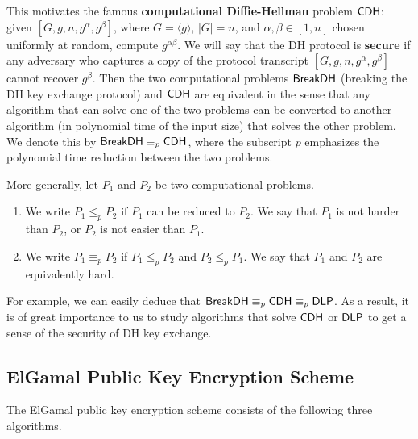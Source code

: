 This motivates the famous {\bf computational Diffie-Hellman} problem ${\sf CDH}$: given 
$[G, g, n, g^\alpha, g^\beta]$, where $G = \langle g \rangle$, $|G| = n$, 
and $\alpha, \beta \in [1, n]$ chosen uniformly at random, compute $g^{\alpha\beta}$. 
We will say that the DH protocol is {\bf secure} if any adversary who captures a 
copy of the protocol transcript $[G, g, n, g^\alpha, g^\beta]$ cannot recover 
$g^\beta$. Then the two computational problems ${\sf BreakDH}$ (breaking the DH 
key exchange protocol) and ${\sf CDH}$ are equivalent in the sense that any algorithm 
that can solve one of the two problems can be converted to another algorithm 
(in polynomial time of the input size) that solves the other problem. We denote this 
by ${\sf BreakDH} \equiv_p {\sf CDH}$, where the subscript $p$ emphasizes the polynomial 
time reduction between the two problems. 

More generally, let $P_1$ and $P_2$ be two computational problems. 
\begin{enumerate}[(1)]
    \item We write $P_1 \leq_p P_2$ if $P_1$ can be reduced to $P_2$. We say that 
          $P_1$ is not harder than $P_2$, or $P_2$ is not easier than $P_1$. 
    \item We write $P_1 \equiv_p P_2$ if $P_1 \leq_p P_2$ and $P_2 \leq_p P_1$. 
          We say that $P_1$ and $P_2$ are equivalently hard. 
\end{enumerate}

For example, we can easily deduce that ${\sf BreakDH} \equiv_p {\sf CDH} \equiv_p {\sf DLP}$. 
As a result, it is of great importance to us to study algorithms that solve 
${\sf CDH}$ or ${\sf DLP}$ to get a sense of the security of DH key exchange. 

\subsection{ElGamal Public Key Encryption Scheme}
The ElGamal public key encryption scheme consists of the following three algorithms. 

